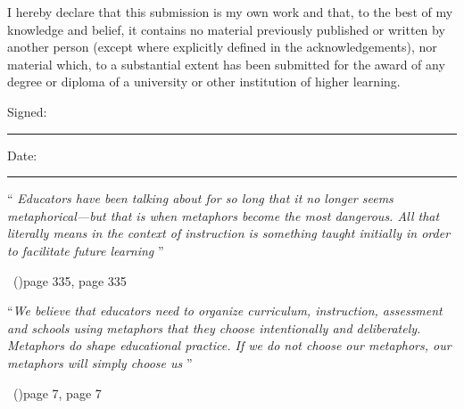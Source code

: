 \documentclass[
12pt, %
oneside, %
english, %
onehalfspacing,
headsepline, %
]{MastersDoctoralThesis} %
\newcommand\mycite[2][]{\citeauthor{#2}\ (\citeyear{#2})\ifx#1\undefined\else, #1\fi}
\begin{document}





\begin{declaration}
\addchaptertocentry{\authorshipname}

\noindent
I hereby declare that this submission is my own work and that, to the
best of my knowledge and belief, it contains no material previously
published or written by another person (except where explicitly
defined in the acknowledgements), nor material which, to a substantial
extent has been submitted for the award of any degree or diploma of a
university or other institution of higher learning.

\rule{0mm}{20mm}

\noindent Signed:\\
\rule[0.5em]{25em}{0.5pt} %
 
\noindent Date:\\
\rule[0.5em]{25em}{0.5pt} %
\end{declaration}

\cleardoublepage







\vspace*{0.2\textheight}


\noindent\begin{singlespace}\enquote{\itshape
Educators have been talking about  for so long
that it no longer seems metaphorical---but that is when metaphors
become the most dangerous.  All that  literally
means in the context of instruction is something taught initially in
order to facilitate future learning
}\bigbreak\end{singlespace}
\hfill\mycite[page 335]{bereiter2005}

\rule{0mm}{30mm}
\noindent\begin{singlespace}\enquote{\itshape We believe that
  educators need to organize curriculum, instruction, assessment and
  schools using metaphors that they choose intentionally and
  deliberately.  Metaphors do shape educational practice.  If we do
  not choose our metaphors, our metaphors will simply choose
  us
}\bigbreak\end{singlespace}
\hfill\mycite[page 7]{badley2012} %
\end{document}
